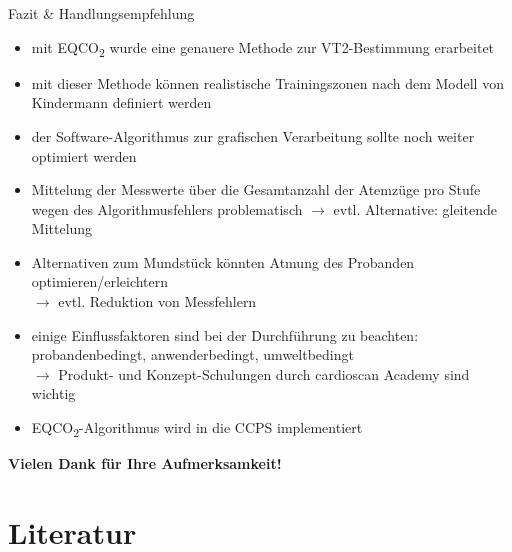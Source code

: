 \documentclass[colorBG,slideColor,8pt]{beamer}
\newcommand{\eqcotwo}{EQCO\textsubscript{2}}
\begin{document}
\begin{frame}{Fazit \& Handlungsempfehlung}
\begin{itemize}
	\item mit \eqcotwo{} wurde eine genauere Methode zur VT2-Bestimmung erarbeitet
	\item mit dieser Methode können realistische Trainingszonen nach dem Modell von Kindermann definiert werden
	\item der Software-Algorithmus zur grafischen Verarbeitung sollte noch weiter optimiert werden
	\item Mittelung der Messwerte über die Gesamtanzahl der Atemzüge pro Stufe wegen des Algorithmusfehlers problematisch $\rightarrow$ evtl. Alternative: gleitende Mittelung
	\item Alternativen zum Mundstück könnten Atmung des Probanden optimieren/erleichtern\\$\rightarrow$ evtl. Reduktion von Messfehlern
	\item einige Einflussfaktoren sind bei der Durchführung zu beachten: probandenbedingt, anwenderbedingt, umweltbedingt\\$\rightarrow$ Produkt- und Konzept-Schulungen durch cardioscan Academy sind wichtig
	\item \eqcotwo-Algorithmus wird in die CCPS implementiert
\end{itemize}
\end{frame}

\begin{frame}
\begin{center}
	\large{\textbf{Vielen Dank für Ihre Aufmerksamkeit!}}
\end{center}
\end{frame}

\section{Literatur}

\begin{frame}
\begin{columns}
\begin{column}{0.9\linewidth}
\nocite{*}
\printbibliography
\end{column}
\end{columns}
\end{frame}
\end{document}
